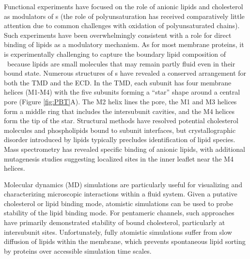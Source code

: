 Functional experiments have focused on the role of anionic lipids and cholesterol as modulators of \plgic s  \cite{Ellena1983,Fong1986,Fong1987,Jones1988,Sunshine1994,DaCosta2009b,Dalziel1980,Addona1998,M.CriadoH.Eibl1982} (the role of polyunsaturation has received comparatively little attention due to common challenges with oxidation of polyunsaturated chains). Such experiments have been overwhelmingly consistent with a role for direct binding of lipids as a modulatory mechanism.   %
As for most membrane proteins, it is experimentally challenging to capture the boundary lipid composition of \plgic~because lipids are small molecules that may remain partly fluid even in their bound state. Numerous structures of \plgic s have revealed a conserved arrangement for both the TMD and the ECD. In the TMD, each subunit has four membrane helices (M1-M4) with the five subunits forming a ``star'' shape around a central pore (Figure \ref{fig:PBT}A). The M2 helix lines the pore, the M1 and M3 helices form a middle ring that includes the intersubunit cavities, and the M4 helices form the tip of the star.  Structural methods have resolved potential cholesterol molecules\cite{Laverty2017, Budelier2019} and phospholipids \cite{Basak2017, Henault2019, Kim2020} bound to subunit interfaces, but crystallographic disorder introduced by lipids typically precludes identification of lipid species. Mass spectrometry has revealed specific binding of anionic lipids, with additional mutagenesis studies suggesting localized sites in the inner leaflet near the M4 helices. \cite{Tong2019} %

Molecular dynamics (MD) simulations are particularly useful for visualizing and characterizing microscopic interactions within a fluid system. Given a putative cholesterol or lipid binding mode, atomistic simulations can be used to probe stability of the lipid binding mode.  For pentameric channels, such approaches have primarily demonstrated stability of bound cholesterol\cite{Brannigan2008}, particularly at intersubunit sites\cite{Laverty2017,Henin2014a}.  Unfortunately, fully atomistic simulations suffer from slow diffusion of lipids within the membrane, which prevents spontaneous lipid sorting by proteins over accessible simulation time scales. 

